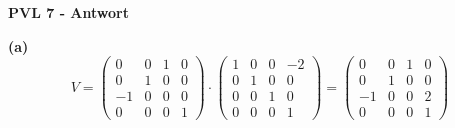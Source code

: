\documentclass[fleqn]{article}
\begin{document}
\noindent\textbf{PVL 7 - Antwort}

\indent\textbf{(a)}
$$V = 
\begin{pmatrix}
    0 & 0 & 1 & 0 \\
    0 & 1 & 0 & 0 \\
    -1 & 0 & 0 &0 \\
    0 & 0 & 0 & 1
\end{pmatrix} \cdot
\begin{pmatrix}
    1 & 0 & 0 & -2 \\
    0 & 1 & 0 & 0 \\
    0 & 0 & 1 & 0 \\
    0 & 0 & 0 & 1
\end{pmatrix} = 
\begin{pmatrix}
    0 & 0 & 1 & 0 \\
    0 & 1 & 0 & 0 \\
    -1 & 0 & 0 & 2 \\
    0 & 0 & 0 & 1
\end{pmatrix}
$$
\end{document}
